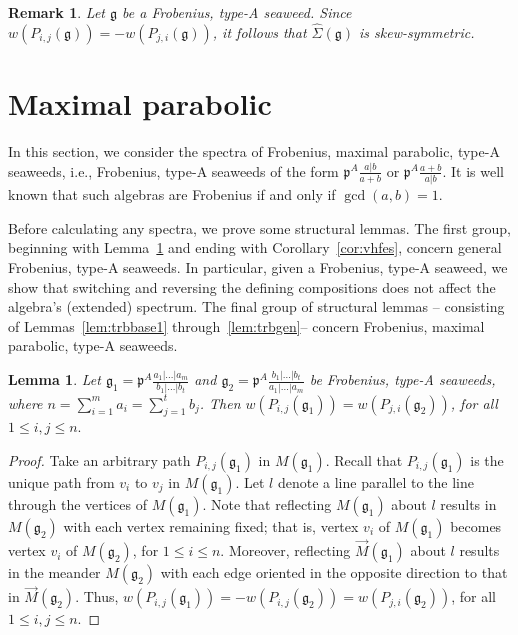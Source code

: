\documentclass[letterpaper,10pt]{article}
\newtheorem{lemma}[theorem]{Lemma}
\newtheorem{remark}[theorem]{Remark}
\begin{document}
\begin{remark}\label{rem:skew}
Let $\mathfrak{g}$ be a Frobenius, type-A seaweed. Since $w(P_{i,j}(\mathfrak{g}))=-w(P_{j,i}(\mathfrak{g}))$, it follows that $\widehat{\Sigma}(\mathfrak{g})$ is skew-symmetric.
\end{remark}

\section{Maximal parabolic}\label{sec:mp}

In this section, we consider the spectra of Frobenius, maximal parabolic, type-A seaweeds, i.e., Frobenius, type-A seaweeds of the form $\mathfrak{p}^A\frac{a|b}{a+b}$ or $\mathfrak{p}^A\frac{a+b}{a|b}$. It is well known that such algebras are Frobenius if and only if $\gcd(a,b)=1$.

Before calculating any spectra, we prove some structural lemmas. The first group, beginning with Lemma~\ref{lem:vflip} and ending with Corollary~\ref{cor:vhfes}, concern general Frobenius, type-A seaweeds. In particular, given a Frobenius, type-A seaweed, we show that switching and reversing the defining compositions does not affect the algebra's (extended) spectrum. The final group of structural lemmas -- consisting of Lemmas~\ref{lem:trbbase1} through~\ref{lem:trbgen}-- concern Frobenius, maximal parabolic, type-A seaweeds.

\begin{lemma}\label{lem:vflip}
Let $\mathfrak{g}_1=\mathfrak{p}^A\frac{a_1|\hdots|a_m}{b_1|\hdots|b_t}$ and $\mathfrak{g}_2=\mathfrak{p}^A\frac{b_1|\hdots|b_t}{a_1|\hdots|a_m}$ be Frobenius, type-A seaweeds, where $n=\sum_{i=1}^ma_i=\sum_{j=1}^tb_j$. Then $w(P_{i,j}(\mathfrak{g}_1))=w(P_{j,i}(\mathfrak{g}_2))$, for all $1\leq i,j\leq n.$
\end{lemma}
\begin{proof}
Take an arbitrary path $P_{i,j}(\mathfrak{g}_1)$ in $M(\mathfrak{g}_1)$. Recall that $P_{i,j}(\mathfrak{g}_1)$ is the unique path from $v_i$ to $v_j$ in $M(\mathfrak{g}_1)$. Let $l$ denote a line parallel to the line through the vertices of $M(\mathfrak{g}_1).$ Note that reflecting $M(\mathfrak{g}_1)$ about $l$ results in $M(\mathfrak{g}_2)$ with each vertex remaining fixed; that is, vertex $v_i$ of $M(\mathfrak{g}_1)$ becomes vertex $v_i$ of $M(\mathfrak{g}_2)$, for $1\le i\le n$. Moreover, reflecting $\overrightarrow{M}(\mathfrak{g}_1)$ about $l$ results in the meander $M(\mathfrak{g}_2)$ with each edge oriented in the opposite direction to that in $\overrightarrow{M}(\mathfrak{g}_2)$. Thus, $w(P_{i,j}(\mathfrak{g}_1))=-w(P_{i,j}(\mathfrak{g}_2))=w(P_{j,i}(\mathfrak{g}_2))$, for all $1\leq i,j\leq n.$
\end{proof}
\end{document}
